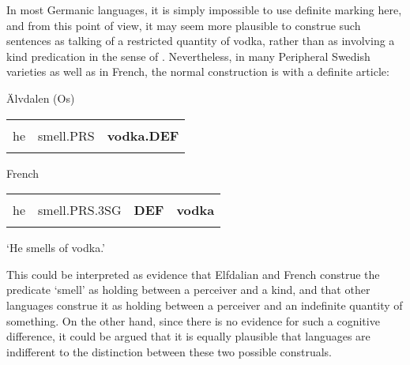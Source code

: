 \begin{styleBodyTextFirst}
In most Germanic languages, it is simply impossible to use definite marking here, and from this point of view, it may seem more plausible to construe such sentences as talking of a restricted quantity of vodka, rather than as involving a kind predication in the sense of \citet{KrifkaEtAl1995}. Nevertheless, in many Peripheral Swedish varieties as well as in French, the normal construction is with a definite article: 

\end{styleBodyTextFirst}

\begin{listWWNumileveli}
\item 

\begin{styleExample}
Älvdalen (Os)

\end{styleExample}

\end{listWWNumileveli}

\begin{tabular}{lll}
\lsptoprule
\multicolumn{3}{l}{An

}\\
he & smell.PRS & {\bfseries vodka.DEF}\\
\lspbottomrule
\end{tabular}

\begin{listWWNumileveli}
\item 

\begin{styleExample}
French

\end{styleExample}

\end{listWWNumileveli}

\begin{tabular}{llll}
\lsptoprule
\multicolumn{4}{l}{Il

}\\
he & smell.PRS.3SG & {\bfseries DEF} & {\bfseries vodka}\\
\lspbottomrule
\end{tabular}

\begin{styleTranslation}
‘He smells of vodka.’

\end{styleTranslation}

\begin{styleBodyTextFirst}
This could be interpreted as evidence that Elfdalian and French construe the predicate ‘smell’ as holding between a perceiver and a kind, and that other languages construe it as holding between a perceiver and an indefinite quantity of something. On the other hand, since there is no evidence for such a cognitive difference, it could be argued that it is equally plausible that languages are indifferent to the distinction between these two possible construals. 

\end{styleBodyTextFirst}

